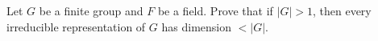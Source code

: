 \begin{prob}
  Let \( G \) be a finite group and \( F \) be a field.
  Prove that if \( |G| > 1 \), then every irreducible representation of \( G \)
  has dimension \( < |G| \).
\end{prob}